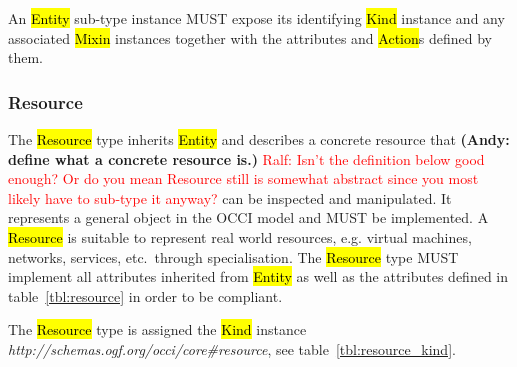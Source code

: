 \documentclass[10pt,a4paper]{article}
\newcommand{\ralf}[1]{\textcolor{red}{Ralf: #1}}
\begin{document}
An \hl{Entity} sub-type instance MUST expose its identifying \hl{Kind} instance
and any associated \hl{Mixin} instances together with the attributes and
\hl{Action}s defined by them.

\subsubsection{Resource}
\label{sec:resource}
The \hl{Resource} type inherits \hl{Entity} and describes a concrete resource that
\textbf{(Andy: define what a concrete resource is.)}
\ralf{Isn't the definition below good enough? Or do you mean Resource still is somewhat abstract since you most likely have to sub-type it anyway?}
can be inspected and manipulated. It represents a general object in the OCCI
model and MUST be implemented. A \hl{Resource} is suitable to represent real
world resources, e.g. virtual machines, networks, services, etc.~through specialisation.
%
The \hl{Resource} type MUST implement all attributes inherited from \hl{Entity}
as well as the attributes defined in table~\ref{tbl:resource} in order
to be compliant.


The \hl{Resource} type is assigned the \hl{Kind} instance
\textit{http://schemas.ogf.org/occi/core\#resource}, see
table~\ref{tbl:resource_kind}.
%
\end{document}
